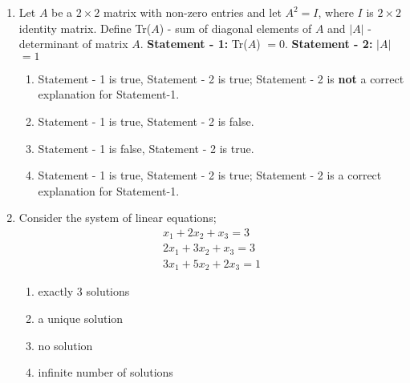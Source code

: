 \documentclass[journal,12pt,twocolumn]{IEEEtran}
\theoremstyle{remark}
\begin{document}
\begin{enumerate}
\begin{enumerate}[label={(\alph*)}]
	\end{enumerate}

    \item Let $A$ be a $2\times2$ matrix with non-zero entries and let $A^2 = I$, where $I$ is $2\times2$ identity matrix. Define 
	\newline
	Tr($A$) - sum of diagonal elements of $A$ and
	\newline
	$|A|$ - determinant of matrix $A$.
	\newline
	\textbf{Statement - 1:} Tr($A$) $= 0$.
	\newline
	\textbf{Statement - 2:} $|A|$ $= 1$

	\begin{enumerate}[label={(\alph*)}]
		\item Statement - 1 is true, Statement - 2 is true; Statement - 2 is \textbf{not} a correct explanation for Statement-1. 
	    	\item Statement - 1 is true, Statement - 2 is false. 
	    	\item Statement - 1 is false, Statement - 2 is true.
	    	\item Statement - 1 is true, Statement - 2 is true; Statement - 2 is a correct explanation for Statement-1. 
	\end{enumerate}

    \item Consider the system of linear equations; 
	\begin{align*}
		x_1 + 2x_2 + x_3 = 3\\
		2x_1 + 3x_2 + x_3 = 3\\
		3x_1 + 5x_2 + 2x_3 = 1
	\end{align*}
	\begin{enumerate}[label={(\alph*)}]
		\item exactly $3$ solutions
	    	\item a unique solution
	    	\item no solution
	    	\item infinite number of solutions
	\end{enumerate}


\end{enumerate}
\end{document}
